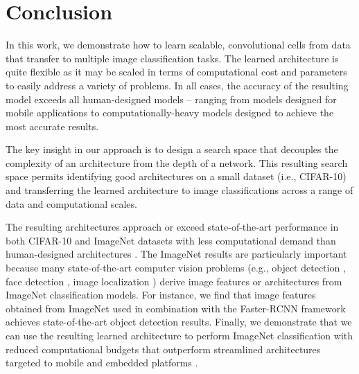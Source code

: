 \section{Conclusion}
In this work, we demonstrate how to learn scalable, convolutional cells from data that transfer to multiple image classification tasks. The learned architecture is quite flexible as it may be scaled in terms of computational cost and parameters to easily address a variety of problems. In all cases, the accuracy of the resulting model exceeds all human-designed models -- ranging from models designed for mobile applications to computationally-heavy models designed to achieve the most accurate results.

The key insight in our approach is to design a search space that decouples the complexity of an architecture from the depth of a network. This resulting search space permits identifying good architectures on a small dataset (i.e., CIFAR-10) and transferring the learned architecture to image classifications across a range of data and computational scales.

The resulting architectures approach or exceed state-of-the-art performance in both CIFAR-10 and ImageNet datasets with less computational demand than human-designed architectures \cite{szegedy2016rethinking,BatchNorm,zhang2016polynet}. The ImageNet results are particularly important because many state-of-the-art computer vision problems (e.g.,  object detection \cite{huang2016speed}, face detection \cite{schroff2015facenet}, image localization \cite{weyand2016planet}) derive image features or architectures from ImageNet classification models. For instance, we find that image features obtained from ImageNet used in combination with the Faster-RCNN framework achieves state-of-the-art object detection results. Finally, we demonstrate that we can use the resulting learned architecture to perform ImageNet classification with reduced computational budgets that outperform streamlined architectures targeted to mobile and embedded platforms \cite{howard2017mobilenets, shufflenet}.


